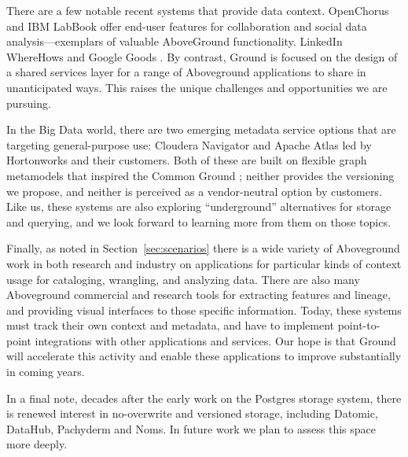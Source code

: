 \documentclass{sig-alternate}
\begin{document}
There are a few notable recent systems that provide data context. OpenChorus and IBM LabBook offer end-user features for collaboration and social data analysis---exemplars of valuable AboveGround functionality.
LinkedIn WhereHows and Google Goods .  
By contrast, Ground is focused on the design of a shared services layer for a range of Aboveground applications to share in unanticipated ways. 
This raises the unique challenges and opportunities we are pursuing.

In the Big Data world, there are two emerging metadata service options that are targeting general-purpose use: Cloudera Navigator and Apache Atlas led by Hortonworks and their customers. 
Both of these are built on flexible graph metamodels that inspired the Common Ground \mantle; neither provides the versioning we propose, and neither is perceived as a vendor-neutral option by customers.  
Like us, these systems are also exploring ``underground'' alternatives for storage and querying, and we look forward to learning more from them on those topics. 


Finally, as noted in Section~\ref{sec:scenarios} there is a wide variety of Aboveground work in both research and industry on applications for particular kinds of context usage for cataloging, wrangling, and analyzing data. 
There are also many Aboveground commercial and research tools for extracting features and lineage, and providing visual interfaces to those specific information.
Today, these systems must track their own context and metadata, and have to implement point-to-point integrations with other applications and services. 
Our hope is that Ground will accelerate this activity and enable these applications to improve substantially in coming years.


In a final note, decades after the early work on the Postgres storage system, there is renewed interest in no-overwrite and versioned storage, including Datomic, DataHub, Pachyderm and Noms. 
In future work we plan to assess this space more deeply. 
\end{document}
